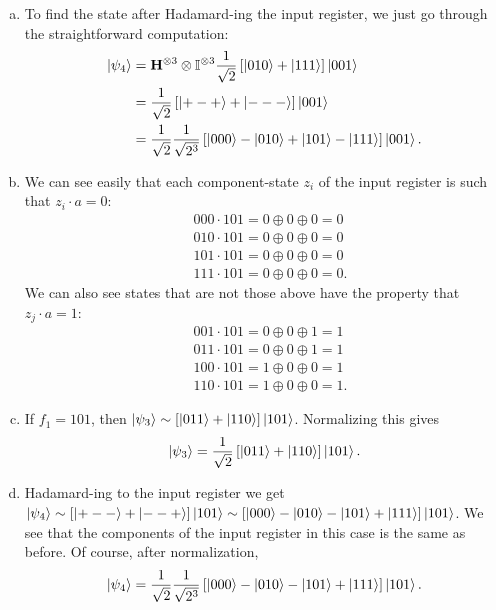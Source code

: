 \documentclass{book}
\theoremstyle{definition}
\newcommand{\nn}{\nonumber}
\newcommand{\f}[2]{\frac{#1}{#2}}
\newcommand{\lb}{\left[}
\newcommand{\rb}{\right]}
\newcommand{\Id}{\mathbb{I}}
\newcommand{\had}{\mathbf{H}}
\begin{document}
\begin{enumerate}[(a)]
	
	
	\item To find the state after Hadamard-ing the input register, we just go through the straightforward computation:
	\begin{align}
	\ket{\psi_4} &= \had^{\otimes 3} \otimes \Id^{\otimes 3} \f{1}{\sqrt{2}}\lb \ket{010} + \ket{111} \rb \ket{001}\nn\\
	&= \f{1}{\sqrt{2}}\lb \ket{+-+} + \ket{---} \rb \ket{001}\nn\\
	&= \f{1}{\sqrt{2}} \f{1}{\sqrt{2^3}}\lb \ket{000} - \ket{010} + \ket{101} - \ket{111}  \rb\ket{001}.
	\end{align} 
	
	
	
	\item We can see easily that each component-state $z_i$ of the input register is such that $z_i \cdot a = 0$:
	\begin{align}
	&000 \cdot 101 = 0 \oplus 0 \oplus 0 = 0\nn\\
	&010 \cdot 101 = 0 \oplus 0 \oplus 0 = 0\nn\\
	&101 \cdot 101 = 0 \oplus 0 \oplus 0 = 0\nn\\
	&111 \cdot 101 = 0 \oplus 0 \oplus 0 = 0.
	\end{align} 
	We can also see states that are not those above have the property that $z_j \cdot a = 1$:
	\begin{align}
	&001 \cdot 101 = 0 \oplus 0 \oplus 1 = 1\nn\\
	&011 \cdot 101 = 0 \oplus 0 \oplus 1 = 1\nn\\
	&100 \cdot 101 = 1 \oplus 0 \oplus 0 = 1\nn\\
	&110 \cdot 101 = 1 \oplus 0 \oplus 0 = 1.
	\end{align} 
	
	
	
	
	\item  If $f_1 = 101$, then $\ket{\psi_3} \sim \lb \ket{011} + \ket{110} \rb \ket{101}$. Normalizing this gives
	\begin{align}
	\ket{\psi_3} = \f{1}{\sqrt{2}}\lb \ket{011} + \ket{110} \rb\ket{101}.
	\end{align}
	
	
	
	
	
	\item Hadamard-ing to the input register we get $\ket{\psi_4} \sim \lb \ket{+--} + \ket{--+} \rb \ket{101} \sim \lb \ket{000} - \ket{010} - \ket{101} + \ket{111} \rb \ket{101}$. We see that the components of the input register in this case is the same as before. Of course, after normalization,
	\begin{align}
	\ket{\psi_4} = \f{1}{\sqrt{2}}\f{1}{\sqrt{2^3}} \lb \ket{000} - \ket{010} - \ket{101} + \ket{111} \rb \ket{101}.
	\end{align}
	

\end{enumerate}
\end{document}
